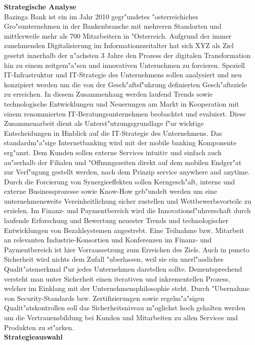 \textbf{Strategische Analyse}\\

Bazinga Bank ist ein im Jahr 2010 gegr"undetes "osterreichiches Gro"sunternehmen in der Bankenbranche mit mehreren Standorten und mittlerweile mehr als 700 Mitarbeitern in "Osterreich. Aufgrund der immer zunehmenden Digitalisierung im Informationszeitalter hat sich XYZ als Ziel gesetzt innerhalb der n"achsten 3 Jahre den Prozess der digitalen Transformation hin zu einem zeitgem"a"sen und innovativen Unternehmen zu forcieren. Speziell IT-Infrastruktur und IT-Strategie des Unternehmens sollen analysiert und neu konzipiert werden um die von der Gesch"aftsf"uhrung definierten Gesch"aftsziele zu erreichen. In diesem Zusammenhang werden laufend Trends sowie technologische Entwicklungen und Neuerungen am Markt in Kooperation mit einem renommierten IT-Beratungsunternehmen beobachtet und evaluiert. Diese Zusammenarbeit dient als Unterst"utzungsgrundlage f"ur wichtige Entscheidungen in Hinblick auf die IT-Strategie des Unternehmens. Das standardm"a"sige Internetbanking wird mit der mobile banking Komponente erg"anzt. Dem Kunden sollen externe Services intuitiv und einfach auch au"serhalb der Filialen und "Offnungszeiten direkt auf dem mobilen Endger"at zur Verf"ugung gestellt werden, nach dem Prinzip \glqq service anywhere and anytime\grqq. Durch die Forcierung von Synergieeffekten sollen Kerngesch"aft, interne und externe Businessprozesse sowie Know-How geb"undelt werden um eine unternehmensweite Vereinheitlichung sicher zustellen und Wettbewerbsvorteile zu erzielen. Im Finanz- und Paymentbereich wird die Innovationsf"uhrerschaft durch laufende Erforschung und Bewertung neuester Trends und technologischer Entwicklungen von Bezahlsystemen angestrebt. Eine Teilnahme bzw. Mitarbeit an relevanten Industrie-Konsortien und Konferenzen im Finanz- und Paymentbereich ist hier Vorraussetzung zum Erreichen des Ziels. Auch in puncto Sicherheit wird nichts dem Zufall "uberlassen, weil  sie ein unerl"assliches Qualit"atsmerkmal f"ur jedes Unternehmen darstellen sollte. Dementsprechend versteht man unter Sicherheit einen iterativen und inkrementellen Prozess, welcher im Einklang mit der Unternehmensphilosophie steht. Durch "Ubernahme von Security-Standards bzw. Zertifizierungen sowie regelm"a"sigen Qualit"atskontrollen soll das Sicherheitsniveau m"oglichst hoch gehalten werden um die Vertrauensbildung bei Kunden und Mitarbeiten zu allen Services und Produkten zu st"arken. \\

\textbf{Strategieauswahl}\\

